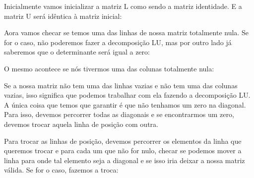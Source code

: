 Inicialmente vamos inicializar a matriz L como sendo a matriz
identidade. E a matriz U será idêntica à matriz inicial:


Aora vamos checar se temos uma das linhas de nossa matriz totalmente
nula. Se for o caso, não poderemos fazer a decomposição LU, mas por
outro lado já saberemos que o determinante será igual a zero:


O mesmo acontece se nós tivermos uma das colunas totalmente nula:


Se a nossa matriz não tem uma das linhas vazias e não tem uma das
colunas vazias, isso significa que podemos trabalhar com ela fazendo a
decomposição LU. A única coisa que temos que garantir é que não
tenhamos um zero na diagonal. Para isso, devemos percorrer todas as
diagonais e se encontrarmos um zero, devemos trocar aquela linha de
posição com outra.

Para trocar as linhas de posição, devemos percorrer os elementos da
linha que queremos trocar e para cada um que não for nulo, checar se
podemos mover a linha para onde tal elemento seja a diagonal e se isso
iria deixar a nossa matriz válida. Se for o caso, fazemos a troca:

